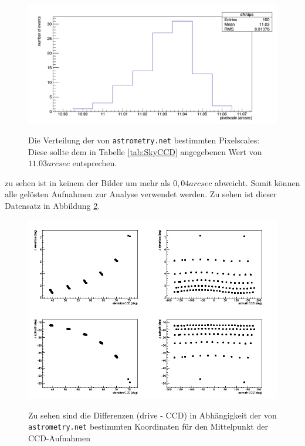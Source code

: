 \begin{figure}[htbp]
\centering
\includegraphics[width=\textwidth]{../341/histo.png}
\label{img:ps}
\caption{Die Verteilung der von \texttt{astrometry.net} bestimmten Pixelscales: Diese sollte dem in Tabelle \ref{tab:SkyCCD} angegebenen Wert von $11.03\unit{arcsec}$ entsprechen.}
\end{figure}
zu sehen ist in keinem der Bilder um mehr als $0,04\unit{arcsec}$ abweicht. Somit können alle gelösten Aufnahmen zur Analyse verwendet werden. Zu sehen ist dieser Datensatz in Abbildung \ref{img:dataset}.
\begin{figure}[htbp]
\centering
\includegraphics[width=\textwidth]{../341/data2.png}
\label{img:dataset}
\caption{Zu sehen sind die Differenzen (drive - CCD) in Abhängigkeit der von \texttt{astrometry.net} bestimmten Koordinaten für den Mittelpunkt der CCD-Aufnahmen}
\end{figure}
